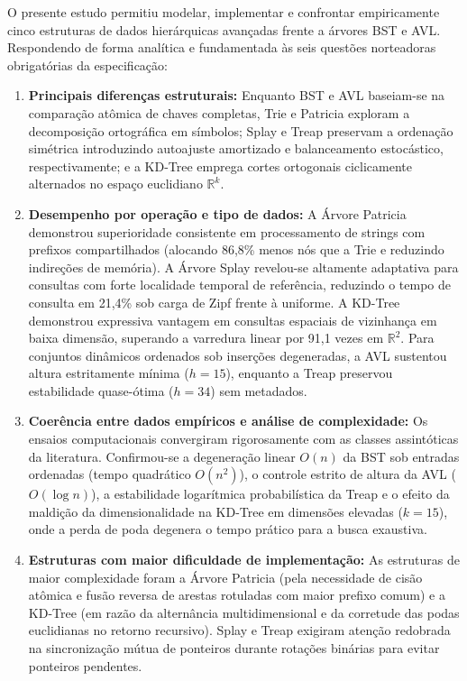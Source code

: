 \documentclass[11pt,a4paper]{article}
\newcommand{\Ogrande}[1]{\ensuremath{O\!\left(#1\right)}}
\begin{document}
O presente estudo permitiu modelar, implementar e confrontar empiricamente cinco estruturas de dados hierárquicas avançadas frente a árvores BST e AVL. Respondendo de forma analítica e fundamentada às seis questões norteadoras obrigatórias da especificação:

\begin{enumerate}[leftmargin=*]
  \item \textbf{Principais diferenças estruturais:} Enquanto BST e AVL baseiam-se na comparação atômica de chaves completas, Trie e Patricia exploram a decomposição ortográfica em símbolos; Splay e Treap preservam a ordenação simétrica introduzindo autoajuste amortizado e balanceamento estocástico, respectivamente; e a KD-Tree emprega cortes ortogonais ciclicamente alternados no espaço euclidiano $\mathbb{R}^k$.
  \item \textbf{Desempenho por operação e tipo de dados:} A Árvore Patricia demonstrou superioridade consistente em processamento de strings com prefixos compartilhados (alocando 86,8\% menos nós que a Trie e reduzindo indireções de memória). A Árvore Splay revelou-se altamente adaptativa para consultas com forte localidade temporal de referência, reduzindo o tempo de consulta em 21,4\% sob carga de Zipf frente à uniforme. A KD-Tree demonstrou expressiva vantagem em consultas espaciais de vizinhança em baixa dimensão, superando a varredura linear por 91,1 vezes em $\mathbb{R}^2$. Para conjuntos dinâmicos ordenados sob inserções degeneradas, a AVL sustentou altura estritamente mínima ($h=15$), enquanto a Treap preservou estabilidade quase-ótima ($h=34$) sem metadados.
  \item \textbf{Coerência entre dados empíricos e análise de complexidade:} Os ensaios computacionais convergiram rigorosamente com as classes assintóticas da literatura. Confirmou-se a degeneração linear $\Ogrande{n}$ da BST sob entradas ordenadas (tempo quadrático $\Ogrande{n^2}$), o controle estrito de altura da AVL ($\Ogrande{\log n}$), a estabilidade logarítmica probabilística da Treap e o efeito da maldição da dimensionalidade na KD-Tree em dimensões elevadas ($k=15$), onde a perda de poda degenera o tempo prático para a busca exaustiva.
  \item \textbf{Estruturas com maior dificuldade de implementação:} As estruturas de maior complexidade foram a Árvore Patricia (pela necessidade de cisão atômica e fusão reversa de arestas rotuladas com maior prefixo comum) e a KD-Tree (em razão da alternância multidimensional e da corretude das podas euclidianas no retorno recursivo). Splay e Treap exigiram atenção redobrada na sincronização mútua de ponteiros durante rotações binárias para evitar ponteiros pendentes.

\end{enumerate}
\end{document}
